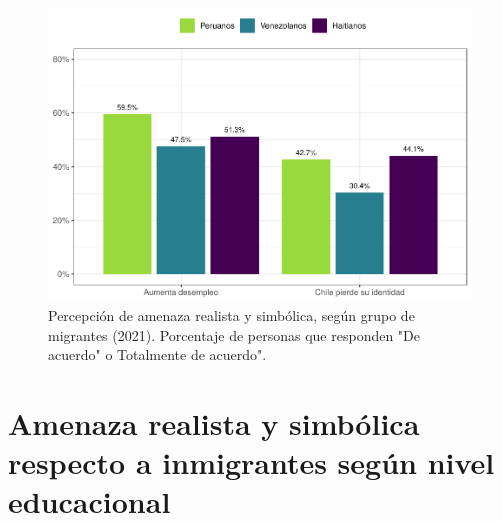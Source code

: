 \documentclass[
  12pt,
]{book}
\begin{document}
\begin{figure}

{\centering \includegraphics{reporte-elsoc_files/figure-latex/amen-wave-1} 

}

\caption{Percepción de amenaza realista y simbólica, según grupo de migrantes (2021). Porcentaje de personas que responden "De acuerdo" o Totalmente de acuerdo".}\label{fig:amen-wave}
\end{figure}

\hypertarget{amenaza-realista-y-simbuxf3lica-respecto-a-inmigrantes-seguxfan-nivel-educacional}{%
\section{Amenaza realista y simbólica respecto a inmigrantes según nivel educacional}\label{amenaza-realista-y-simbuxf3lica-respecto-a-inmigrantes-seguxfan-nivel-educacional}}
\end{document}
